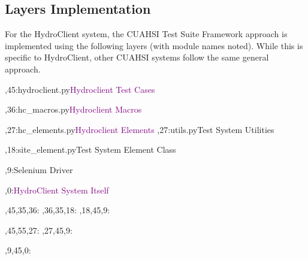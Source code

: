 \documentclass[10pt]{article}
\newcommand{\callemp}{\textcolor{purple}}
\begin{document}
\subsection{Layers Implementation}
For the HydroClient system, the CUAHSI Test Suite Framework approach is implemented using the following layers (with module names noted).  While this is specific to HydroClient, other CUAHSI systems follow the same general approach.
\begin{chart}%
  ,45:{hydroclient.py}{\callemp{Hydroclient Test Cases}}{}

  ,36:{hc\_macros.py}{\callemp{Hydroclient Macros}}{}

  ,27:{hc\_elements.py}{\callemp{Hydroclient Elements}}{}
  ,27:{utils.py}{Test System Utilities}{}

  ,18:{site\_element.py}{Test System Element Class}{}

  ,9:{}{Selenium Driver}{}

  ,0:{}{\callemp{HydroClient System Itself}}{}

  ,45,35,36:
  ,36,35,18:
  ,18,45,9:

  ,45,55,27:
  ,27,45,9:

  ,9,45,0:



\end{chart}
\end{document}

